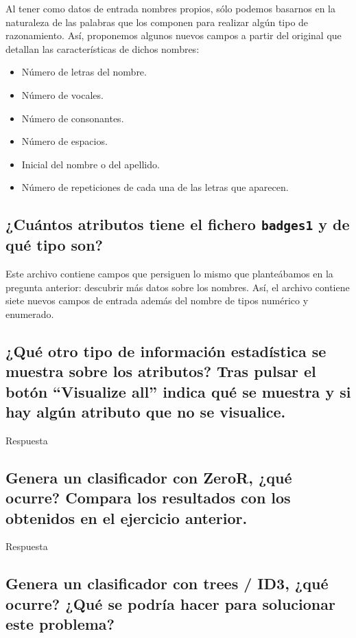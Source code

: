 \documentclass[12pt]{article}
\begin{document}
Al tener como datos de entrada nombres propios, sólo podemos basarnos en la
naturaleza de las palabras que los componen para realizar algún tipo de
razonamiento. Así, proponemos algunos nuevos campos a partir del original que
detallan las características de dichos nombres:

\begin{itemize}
    \item Número de letras del nombre.
    \item Número de vocales.
    \item Número de consonantes.
    \item Número de espacios.
    \item Inicial del nombre o del apellido.
    \item Número de repeticiones de cada una de las letras que aparecen.
\end{itemize}

\subsection{\small ¿Cuántos atributos tiene el fichero \texttt{badges1} y de
qué tipo son?}

Este archivo contiene campos que persiguen lo mismo que planteábamos en la
pregunta anterior: descubrir más datos sobre los nombres. Así, el archivo
contiene siete nuevos campos de entrada además del nombre de tipos numérico y
enumerado.

\subsection{\small ¿Qué otro tipo de información estadística se muestra sobre
los atributos? Tras pulsar el botón ``Visualize all'' indica qué se muestra y
si hay algún atributo que no se visualice.}

Respuesta

\subsection{\small Genera un clasificador con ZeroR, ¿qué ocurre? Compara los
resultados con los obtenidos en el ejercicio anterior.}

Respuesta

\subsection{\small Genera un clasificador con trees / ID3, ¿qué ocurre? ¿Qué se
podría hacer para solucionar este problema?}
\end{document}
